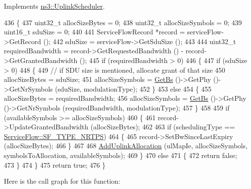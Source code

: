 Implements \hyperlink{classns3_1_1UplinkScheduler_a6e702b7f0bdb490a762b5e2b9b13c362}{ns3\+::\+Uplink\+Scheduler}.


\begin{DoxyCode}
436 \{
437   uint32\_t allocSizeBytes = 0;
438   uint32\_t allocSizeSymbols = 0;
439   uint16\_t sduSize = 0;
440 
441   ServiceFlowRecord *record = serviceFlow->GetRecord ();
442   sduSize = serviceFlow->GetSduSize ();
443 
444   uint32\_t requiredBandwidth = record->GetRequestedBandwidth () - record->GetGrantedBandwidth ();
445   \textcolor{keywordflow}{if} (requiredBandwidth > 0)
446     \{
447       \textcolor{keywordflow}{if} (sduSize > 0)
448         \{
449           \textcolor{comment}{// if SDU size is mentioned, allocate grant of that size}
450           allocSizeBytes = sduSize;
451           allocSizeSymbols = \hyperlink{classns3_1_1UplinkScheduler_afe61b7de71d92d2dff1b135744a6ff7e}{GetBs} ()->GetPhy ()->GetNrSymbols (sduSize, modulationType);
452         \}
453       \textcolor{keywordflow}{else}
454         \{
455           allocSizeBytes = requiredBandwidth;
456           allocSizeSymbols = \hyperlink{classns3_1_1UplinkScheduler_afe61b7de71d92d2dff1b135744a6ff7e}{GetBs} ()->GetPhy ()->GetNrSymbols (requiredBandwidth, modulationType);
457         \}
458 
459       \textcolor{keywordflow}{if} (availableSymbols >= allocSizeSymbols)
460         \{
461           record->UpdateGrantedBandwidth (allocSizeBytes);
462 
463           \textcolor{keywordflow}{if} (schedulingType == \hyperlink{classns3_1_1ServiceFlow_a7990ba10be1e098328fd1e6382a26235a7f8577f851a9f01d159442a3a3fcdf48}{ServiceFlow::SF\_TYPE\_NRTPS})
464             \{
465               record->SetBwSinceLastExpiry (allocSizeBytes);
466             \}
467 
468           \hyperlink{classns3_1_1UplinkSchedulerSimple_a078c18f311ce90cbceab11a54cd4606e}{AddUplinkAllocation} (ulMapIe, allocSizeSymbols, symbolsToAllocation, 
      availableSymbols);
469         \}
470       \textcolor{keywordflow}{else}
471         \{
472           \textcolor{keywordflow}{return} \textcolor{keyword}{false};
473         \}
474     \}
475   \textcolor{keywordflow}{return} \textcolor{keyword}{true};
476 \}
\end{DoxyCode}


Here is the call graph for this function\+:


